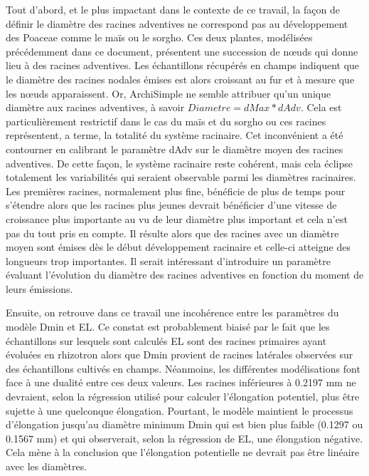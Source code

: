 Tout d'abord, et le plus impactant dans le contexte de ce travail, la façon de définir le diamètre des racines adventives ne correspond pas au développement des Poaceae comme le maïs ou le sorgho.
Ces deux plantes, modélisées précédemment dans ce document, présentent une succession de nœuds qui donne lieu à des racines adventives.
Les échantillons récupérés en champs indiquent que le diamètre des racines nodales émises est alors croissant au fur et à mesure que les nœuds apparaissent.
Or, ArchiSimple ne semble attribuer qu'un unique diamètre aux racines adventives, à savoir $Diametre = dMax*dAdv$.
Cela est particulièrement restrictif dans le cas du maïs et du sorgho ou ces racines représentent, a terme, la totalité du système racinaire.
Cet inconvénient a été contourner en calibrant le paramètre dAdv sur le diamètre moyen des racines adventives.
De cette façon, le système racinaire reste cohérent, mais cela éclipse totalement les variabilités qui seraient observable parmi les diamètres racinaires.
Les premières racines, normalement plus fine, bénéficie de plus de temps pour s'étendre alors que les racines plus jeunes devrait bénéficier d'une vitesse de croissance plus importante au vu de leur diamètre plus important et cela n'est pas du tout pris en compte.
Il résulte alors que des racines avec un diamètre moyen sont émises dès le début développement racinaire et celle-ci atteigne des longueurs trop importantes.
Il serait intéressant d'introduire un paramètre évaluant l'évolution du diamètre des racines adventives en fonction du moment de leurs émissions.
\newline

Ensuite, on retrouve dans ce travail une incohérence entre les paramètres du modèle Dmin et EL.
Ce constat est probablement biaisé par le fait que les échantillons sur lesquels sont calculés EL sont des racines primaires ayant évoluées en rhizotron alors que Dmin provient de racines latérales observées sur des échantillons cultivés en champs.
Néanmoins, les différentes modélisations font face à une dualité entre ces deux valeurs.
Les racines inférieures à 0.2197 mm ne devraient, selon la régression utilisé pour calculer l'élongation potentiel, plus être sujette à une quelconque élongation.
Pourtant, le modèle maintient le processus d'élongation jusqu'au diamètre minimum Dmin qui est bien plus faible (0.1297 ou 0.1567 mm) et qui observerait, selon la régression de EL, une élongation négative.
Cela mène à la conclusion que l'élongation potentielle ne devrait pas être linéaire avec les diamètres.
\newline

